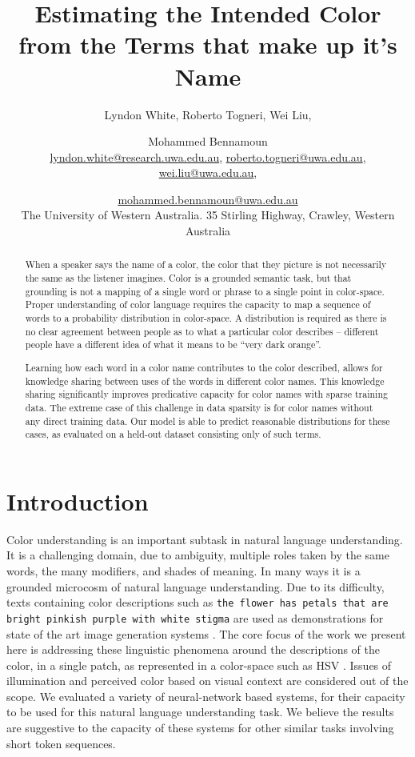 \documentclass[11pt,a4paper]{article}
\title{Estimating the Intended Color from the Terms that make up it's Name}
\author{Lyndon White, %
	Roberto Togneri, %
	Wei Liu, %
	\and Mohammed Bennamoun%
	\\ 
	\url{lyndon.white@research.uwa.edu.au}, %
	\url{roberto.togneri@uwa.edu.au},\\
	\url{wei.liu@uwa.edu.au}, %
	\and \url{mohammed.bennamoun@uwa.edu.au}%
	\\
	The University of Western Australia.
	35 Stirling Highway, Crawley, Western Australia
}
\newcommand{\parencite}{\citep}
\begin{document}
\maketitle

\begin{abstract}
When a speaker says the name of a color, the color that they picture is not necessarily the same as the listener imagines.
Color is a grounded semantic task, but that grounding is not a mapping of a single word or phrase to a single point in color-space.
Proper understanding of color language requires the capacity to map a sequence of words to a probability distribution in color-space.
A distribution is required as there is no clear agreement between people as to what a particular color describes -- different people have a different idea of what it means to be ``very dark orange''.

Learning how each word in a color name contributes to the color described,
allows for knowledge sharing between uses of the words in different color names.
This knowledge sharing significantly improves predicative capacity for color names with sparse training data.
The extreme case of this challenge in data sparsity is for color names without any direct training data.
Our model is able to predict reasonable distributions for these cases, as evaluated on a held-out dataset consisting only of such terms.
\end{abstract}

\section{Introduction}\label{sec:intro}

Color understanding is an important subtask in natural language understanding.
It is a challenging domain, due to ambiguity, multiple roles taken by the same words, the many modifiers, and shades of meaning.
In many ways it is a grounded microcosm of natural language understanding.
Due to its difficulty, texts containing color descriptions such as \texttt{the flower has petals that are bright pinkish purple with white stigma} are used as demonstrations for state of the art image generation systems \parencite{reed2016generative, 2015arXiv151102793M}.
The core focus of the work we present here is addressing these linguistic phenomena around the descriptions of the color, in a single patch, as represented in a color-space such as HSV \parencite{smith1978color}.
Issues of illumination and perceived color based on visual context are considered out of the scope.
We evaluated a variety of neural-network based systems, for their capacity to be used for this natural language understanding task.
We believe the results are suggestive to the capacity of these systems for other similar tasks involving short token sequences.
\end{document}
